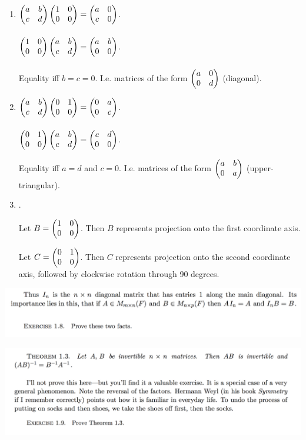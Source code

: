 \documentclass[12pt]{article}
\begin{document}
\begin{enumerate}[label=(\alph*)]
\item
  $\begin{pmatrix}a & b\\c & d\\ \end{pmatrix}\begin{pmatrix}1 & 0\\0 & 0\\ \end{pmatrix} = \begin{pmatrix}a & 0\\c & 0\\ \end{pmatrix}$.\\~\\
  $\begin{pmatrix}1 & 0\\0 & 0\\ \end{pmatrix}\begin{pmatrix}a & b\\c & d\\ \end{pmatrix} = \begin{pmatrix}a & b\\0 & 0\\ \end{pmatrix}$.\\~\\
  Equality iff $b = c = 0$.  I.e. matrices of the form
  $\begin{pmatrix}a & 0\\0 & d\\ \end{pmatrix}$ (diagonal).
\item
  $\begin{pmatrix}a & b\\c & d\\ \end{pmatrix}\begin{pmatrix}0 & 1\\0 & 0\\ \end{pmatrix} = \begin{pmatrix}0 & a\\0 & c\\ \end{pmatrix}$.\\~\\
  $\begin{pmatrix}0 & 1\\0 & 0\\ \end{pmatrix}\begin{pmatrix}a & b\\c & d\\ \end{pmatrix} = \begin{pmatrix}c & d\\0 & 0\\ \end{pmatrix}$.

  Equality iff $a = d$ and $c = 0$. I.e. matrices of the form
  $\begin{pmatrix}a & b\\0 & a\\ \end{pmatrix}$ (upper-triangular).
\item {}.

  Let $B = \begin{pmatrix}1 & 0\\0 & 0\\ \end{pmatrix}$. Then $B$ represents projection
  onto the first coordinate axis.

  Let $C = \begin{pmatrix}0 & 1\\0 & 0\\ \end{pmatrix}$. Then $C$ represents projection
  onto the second coordinate axis, followed by clockwise rotation through 90 degrees.

\end{enumerate}

\begin{mdframed}
\includegraphics[width=400pt]{img/oxford-prelims-M1-linear-algebra-1-8.png}
\end{mdframed}

\begin{mdframed}
\includegraphics[width=400pt]{img/oxford-prelims-M1-linear-algebra-1-9.png}
\end{mdframed}
\end{document}
